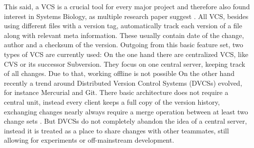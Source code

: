 	This said, a VCS is a crucial tool for every major project and therefore also found interest in Systems Biology, as multiple research paper suggest \citep{Waltemath2013,Beard2009,Hucka2003,Li2010,Miller2011}.
	All VCS, besides using different files with a version tag, automatically track each version of a file along with relevant meta information. These usually contain date of the change, author and a checksum of the version.
	Outgoing from this basic feature set, two types of VCS are currently used: On the one hand there are centralized VCS, like CVS or its successor Subversion. They focus on one central server, keeping track of all changes. Due to that, working offline is not possible \citep{Collins-Sussman2004}
	On the other hand recently a trend around Distributed Version Control Systems (DVCSs) evolved, for instance Mercurial and Git. There basic architecture does not require a central unit, instead every client keeps a full copy of the version history, exchanging changes nearly always require a merge operation between at least two change sets \citep{OSullivan2009}.
	But DVCSs do not completely abandon the idea of a central server, instead it is treated as a place to share changes with other teammates, still allowing for experiments or off-mainstream development.
	
	\begin{comment}
	\begin{itemize}
		\item benefits of version control systems
			\subitem \todo{elaborate}
			\subitem "The need for model version control has been previously discussed in research groups facing model evolution in computational biology (Beard et al., 2009; Cuellar et al., 2006; Hucka et al., 2010; Li et al., 2010; Miller et al., 2011). In general, VCSs such as Subversion (http://subversion.apache.org/) (SVN)" \citep{Waltemath2013}
		\item simple file storage
			\subitem storing files next to each other in the file system
			\subitem "-version1", "-version2", "-final"
			\subitem no meta information stored along with versions (author, time stamp)
			\subitem collaboration causes problems
			\subitem but: simple and quick
		\item SVN
			\subitem client/server architecture
			\subitem collaboration possible, through branching and merging capability
			\subitem reverse-delta storage
			\subitem no offline work possible
		\item GIT
			\subitem distributed VCS
			\subitem reverse-delta storage with version graph
			\subitem build for heavy collaboration by using information from the version graph for merging
			\subitem \todo{refer to version-graph later, when explaining db concept}
			\subitem \url{https://git-scm.com/book/en/v2/Git-Internals-Plumbing-and-Porcelain}
	\end{itemize}
	\end{comment}
		
